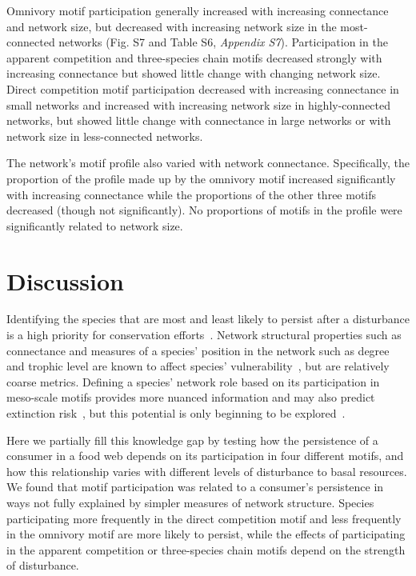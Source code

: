 \documentclass[12pt]{article}
\begin{document}
\begin{spacing}{2.0}
        
        Omnivory motif participation generally increased with increasing connectance and network size, but decreased with increasing network size in the most-connected networks (Fig. S7 and Table S6, \emph{Appendix S7}).
        Participation in the apparent competition and three-species chain motifs decreased strongly with increasing connectance but showed little change with changing network size.
        Direct competition motif participation decreased with increasing connectance in small networks and increased with increasing network size in highly-connected networks, but showed little change with connectance in large networks or with network size in less-connected networks.

        
        The network's motif profile also varied with network connectance.
        Specifically, the proportion of the profile made up by the omnivory motif increased significantly  with increasing connectance while the proportions of the other three motifs decreased (though not significantly).
        No proportions of motifs in the profile were significantly related to network size.


\section*{Discussion}

    Identifying the species that are most and least likely to persist after a disturbance is a high priority for conservation efforts~\citep{Bottrilletal2008}. 
    Network structural properties such as connectance and measures of a species' position in the network such as degree and trophic level are known to affect species' vulnerability~\citep{Dunne2002, Eklof2006, PascualDunne2006,prill2005dynamic, bascompte2005simple,curtsdotter2011robustness, dunne2009cascading}, but are relatively coarse metrics.
    Defining a species' network role based on its participation in meso-scale motifs provides more nuanced information and may also predict extinction risk~\citep{Stouffer2007,Stouffer2010b,Simmons2019,Cirtwill2018FoodWebs}, but this potential is only beginning to be explored~\citep{Cirtwill2022Oikos}.

    
    Here we partially fill this knowledge gap by testing how the persistence of a consumer in a food web depends on its participation in four different motifs, and how this relationship varies with different levels of disturbance to basal resources.  
    We found that motif participation was related to a consumer's persistence in ways not fully explained by simpler measures of network structure. 
    Species participating more frequently in the direct competition motif and less frequently in the omnivory motif are more likely to persist, while the effects of participating in the apparent competition or three-species chain motifs depend on the strength of disturbance.



\end{spacing}
\end{document}
